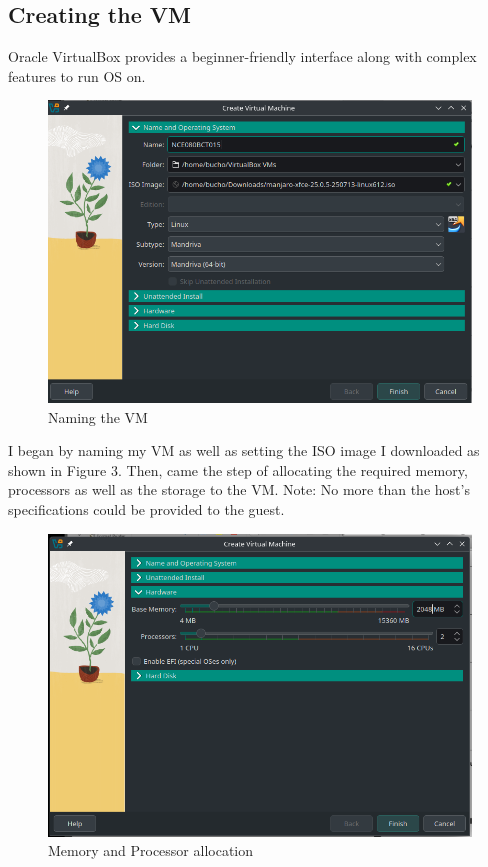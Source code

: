\documentclass[a4paper,12pt]{report}
\begin{document}
\subsection{Creating the VM}
Oracle VirtualBox provides a beginner-friendly interface along with complex features to run OS on.
\newline
\begin{figure}[h]
    \centering
    \includegraphics[width=1\linewidth]{creation.png}
    \caption{Naming the VM}
    \label{fig3}
\end{figure}
\newline
I began by naming my VM as well as setting the ISO image I downloaded as shown in Figure 3.
\newline
Then, came the step of allocating the required memory, processors as well as the storage to the VM. 
Note: No more than the host's specifications could be provided to the guest.
\newpage
\begin{figure}[h]
    \centering
    \includegraphics[width=0.7\linewidth]{sys_config.png}
    \caption{Memory and Processor allocation}
    \label{fig4}
\end{figure}
\end{document}
